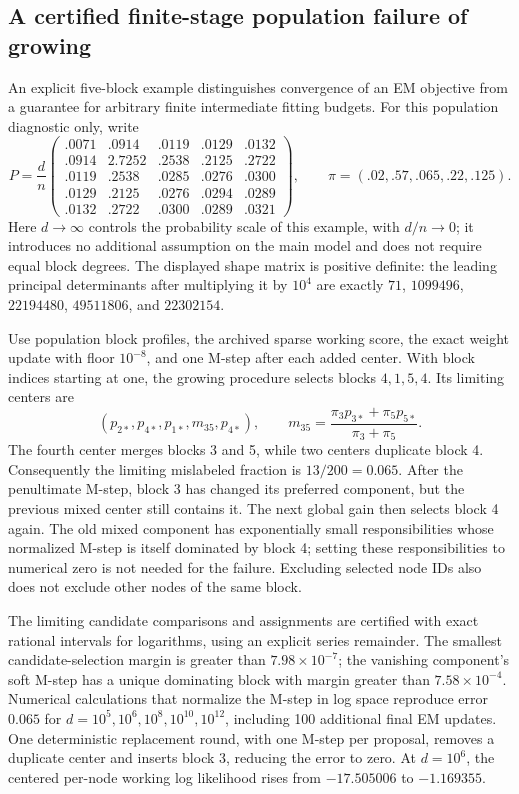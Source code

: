 \documentclass[11pt]{article}
\theoremstyle{definition}
\theoremstyle{remark}
\numberwithin{equation}{section}
\begin{document}
\subsection{A certified finite-stage population failure of growing}
\label{sec:population_growing_failure}
An explicit five-block example distinguishes convergence of an EM objective
from a guarantee for arbitrary finite intermediate fitting budgets. For this
population diagnostic only, write
\begin{equation}
 P=\frac d n
 \begin{pmatrix}
 .0071&.0914&.0119&.0129&.0132\\
 .0914&2.7252&.2538&.2125&.2722\\
 .0119&.2538&.0285&.0276&.0300\\
 .0129&.2125&.0276&.0294&.0289\\
 .0132&.2722&.0300&.0289&.0321
 \end{pmatrix},\qquad
 \pi=(.02,.57,.065,.22,.125).
 \label{eq:population_growing_example}
\end{equation}
Here $d\to\infty$ controls the probability scale of this example, with
$d/n\to0$; it introduces no additional assumption on the main model and
does not require equal block degrees. The displayed shape matrix is positive
definite: the leading principal determinants after multiplying it by
$10^4$ are exactly $71$, $1099496$, $22194480$, $49511806$, and $22302154$.

Use population block profiles, the archived sparse working score, the exact
weight update with floor $10^{-8}$, and one M-step after each added center.
With block indices starting at one, the growing procedure selects blocks
$4,1,5,4$. Its limiting centers are
\[
 (p_{2*},p_{4*},p_{1*},m_{35},p_{4*}),\qquad
 m_{35}=\frac{\pi_3p_{3*}+\pi_5p_{5*}}{\pi_3+\pi_5}.
\]
The fourth center merges blocks 3 and 5, while two centers duplicate block
4. Consequently the limiting mislabeled fraction is $13/200=0.065$.
After the penultimate M-step, block 3 has changed its preferred component,
but the previous mixed center still contains it. The next global gain then
selects block 4 again. The old mixed component has exponentially small
responsibilities whose normalized M-step is itself dominated by block 4;
setting these responsibilities to numerical zero is not needed for the
failure. Excluding selected node IDs also does not exclude other nodes of
the same block.

The limiting candidate comparisons and assignments are certified with exact
rational intervals for logarithms, using an explicit series remainder. The
smallest candidate-selection margin is greater than $7.98\times10^{-7}$;
the vanishing component's soft M-step has a unique dominating block with
margin greater than $7.58\times10^{-4}$. Numerical calculations that normalize
the M-step in log space reproduce error $0.065$ for
$d=10^5,10^6,10^8,10^{10},10^{12}$, including 100 additional final EM updates.
One deterministic replacement round, with one M-step per proposal, removes
a duplicate center and inserts block 3, reducing the error to zero. At
$d=10^6$, the centered per-node working log likelihood rises from
$-17.505006$ to $-1.169355$.
\end{document}
